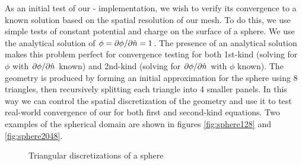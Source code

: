 As an initial test of our {\fmm}-{\bem} implementation, we wish to verify its convergence to a known solution based on the spatial resolution of our mesh. To do this,  we use simple tests of constant potential and charge on the surface of a sphere. We use the analytical solution of $\phi = \partial \phi / \partial \hat{n} = 1$. The presence of an analytical solution makes this problem perfect for convergence testing for both 1st-kind (solving for $\phi$ with $\partial \phi / \partial \hat{n}$ known) and 2nd-kind (solving for $\partial \phi / \partial \hat{n}$ with $\phi$ known). The geometry is produced by forming an initial approximation for the sphere using 8 triangles, then recursively splitting each triangle into 4 smaller panels. In this way we can control the spatial discretization of the geometry and use it to test real-world convergence of our {\bem} for both first and second-kind equations. Two examples of the spherical domain are shown in figures \ref{fig:sphere128} and \ref{fig:sphere2048}.

\begin{center}
\begin{figure}[h]
	\qquad
	\qquad
	\caption{Triangular discretizations of a sphere}
	\label{fig:glob_spheres}
\end{figure}
\end{center}


